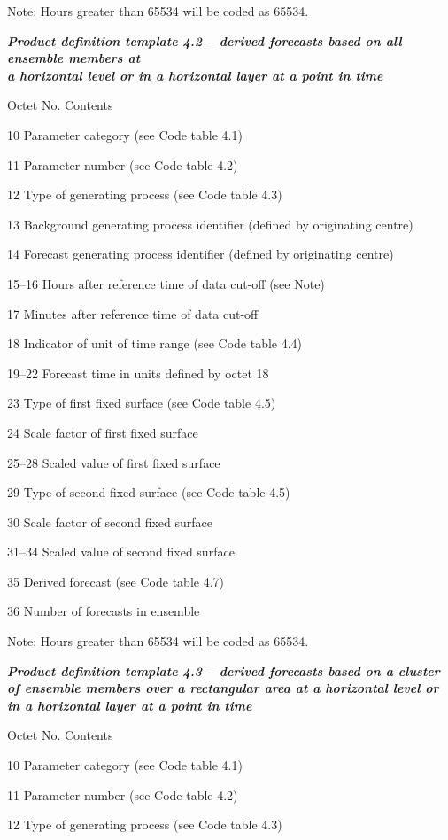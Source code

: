 Note: Hours greater than 65534 will be coded as 65534.

\emph{\textbf{Product definition template 4.2 -- derived forecasts based on all ensemble members at\\
a horizontal level or in a horizontal layer at a point in time}}

Octet No. Contents

10 Parameter category (see Code table 4.1)

11 Parameter number (see Code table 4.2)

12 Type of generating process (see Code table 4.3)

13 Background generating process identifier (defined by originating centre)

14 Forecast generating process identifier (defined by originating centre)

15--16 Hours after reference time of data cut-off (see Note)

17 Minutes after reference time of data cut-off

18 Indicator of unit of time range (see Code table 4.4)

19--22 Forecast time in units defined by octet 18

23 Type of first fixed surface (see Code table 4.5)

24 Scale factor of first fixed surface

25--28 Scaled value of first fixed surface

29 Type of second fixed surface (see Code table 4.5)

30 Scale factor of second fixed surface

31--34 Scaled value of second fixed surface

35 Derived forecast (see Code table 4.7)

36 Number of forecasts in ensemble

Note: Hours greater than 65534 will be coded as 65534.

\emph{\textbf{Product definition template 4.3 -- derived forecasts based on a cluster of ensemble members over a rectangular area at a horizontal level or in a horizontal layer at a point in time}}

Octet No. Contents

10 Parameter category (see Code table 4.1)

11 Parameter number (see Code table 4.2)

12 Type of generating process (see Code table 4.3)


